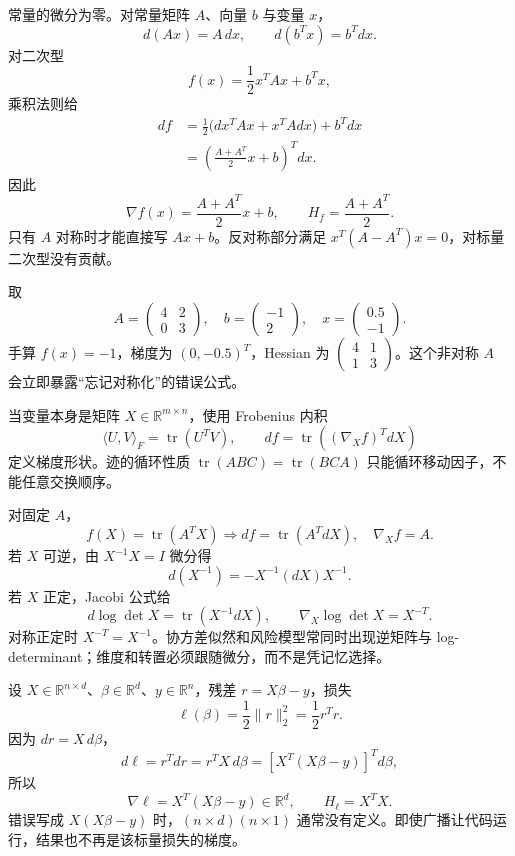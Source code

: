 常量的微分为零。对常量矩阵 $A$、向量 $b$ 与变量 $x$，
\[
 d(Ax)=A\,dx,
 \qquad d(b^Tx)=b^Tdx.
\]
对二次型
\[
 f(x)=\frac12x^TAx+b^Tx,
\]
乘积法则给
\[
 \begin{aligned}
 df
 &=\frac12\bigl(dx^TAx+x^TAdx\bigr)+b^Tdx\\
 &=\left(\frac{A+A^T}{2}x+b\right)^Tdx.
 \end{aligned}
\]
因此
\[
 \nabla f(x)=\frac{A+A^T}{2}x+b,
 \qquad H_f=\frac{A+A^T}{2}.
\]
只有 $A$ 对称时才能直接写 $Ax+b$。反对称部分满足 $x^T(A-A^T)x=0$，对标量二次型没有贡献。

取
\[
 A=\begin{pmatrix}4&2\\0&3\end{pmatrix},\quad
 b=\begin{pmatrix}-1\\2\end{pmatrix},\quad
 x=\begin{pmatrix}0.5\\-1\end{pmatrix}.
\]
手算 $f(x)=-1$，梯度为 $(0,-0.5)^T$，Hessian 为
$\left(\begin{smallmatrix}4&1\\1&3\end{smallmatrix}\right)$。这个非对称 $A$ 会立即暴露“忘记对称化”的错误公式。


当变量本身是矩阵 $X\in\mathbb R^{m\times n}$，使用 Frobenius 内积
\[
 \langle U,V\rangle_F=\operatorname{tr}(U^TV),
 \qquad df=\operatorname{tr}((\nabla_Xf)^T dX)
\]
定义梯度形状。迹的循环性质 $\operatorname{tr}(ABC)=\operatorname{tr}(BCA)$ 只能循环移动因子，不能任意交换顺序。

对固定 $A$，
\[
 f(X)=\operatorname{tr}(A^TX)
 \Longrightarrow df=\operatorname{tr}(A^TdX),
 \quad \nabla_Xf=A.
\]
若 $X$ 可逆，由 $X^{-1}X=I$ 微分得
\[
 d(X^{-1})=-X^{-1}(dX)X^{-1}.
\]
若 $X$ 正定，Jacobi 公式给
\[
 d\log\det X=\operatorname{tr}(X^{-1}dX),
 \qquad \nabla_X\log\det X=X^{-T}.
\]
对称正定时 $X^{-T}=X^{-1}$。协方差似然和风险模型常同时出现逆矩阵与 log-determinant；维度和转置必须跟随微分，而不是凭记忆选择。


设 $X\in\mathbb R^{n\times d}$、$\beta\in\mathbb R^d$、$y\in\mathbb R^n$，残差 $r=X\beta-y$，损失
\[
 \ell(\beta)=\frac12\lVert r\rVert_2^2
 =\frac12r^Tr.
\]
因为 $dr=X\,d\beta$，
\[
 d\ell=r^Tdr=r^TX\,d\beta
 =[X^T(X\beta-y)]^Td\beta,
\]
所以
\[
 \nabla\ell=X^T(X\beta-y)\in\mathbb R^d,
 \qquad H_\ell=X^TX.
\]
错误写成 $X(X\beta-y)$ 时，$(n\times d)(n\times1)$ 通常没有定义。即使广播让代码运行，结果也不再是该标量损失的梯度。

